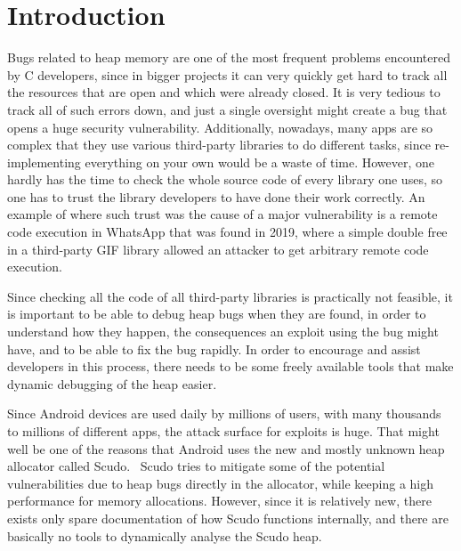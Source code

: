 \documentclass[a4paper,11pt,oneside]{report}
\begin{document}
\chapter{Introduction}


Bugs related to heap memory are one of the most frequent problems encountered
by C developers, since in bigger projects it can very quickly get hard to track
all the resources that are open and which were already closed. It is very tedious
to track all of such errors down, and just a single oversight might create a bug
that opens a huge security vulnerability. Additionally, nowadays, many apps are so
complex that they use various third-party libraries to do different tasks, since
re-implementing everything on your own would be a waste of time. However, one
hardly has the time to check the whole source code of every library one uses, so
one has to trust the library developers to have done their work correctly. An
example of where such trust was the cause of a major vulnerability is a remote
code execution in WhatsApp that was found in 2019, where a simple double free
in a third-party GIF library allowed an attacker to get arbitrary remote code
execution.~\cite{whatsappRCE}

Since checking all the code of all third-party libraries is practically not
feasible, it is important to be able to debug heap bugs when they are found, in
order to understand how they happen, the consequences an exploit using the
bug might have, and to be able to fix the bug rapidly. In order to encourage
and assist developers in this process, there needs to be some freely available
tools that make dynamic debugging of the heap easier.

Since Android devices are used daily by millions of users, with many thousands to
millions of different apps, the attack surface for exploits is huge. That might
well be one of the reasons that Android uses the new and mostly unknown heap
allocator called Scudo.~\cite{llvmScudo} Scudo tries to mitigate some of the potential
vulnerabilities due to heap bugs directly in the allocator, while keeping a high
performance for memory allocations. However, since it is relatively new, there
exists only spare documentation of how Scudo functions internally, and there
are basically no tools to dynamically analyse the Scudo heap.
\end{document}
